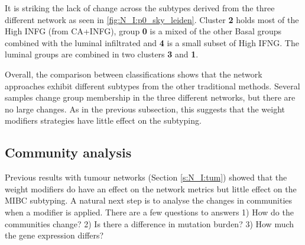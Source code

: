 It is striking the lack of change across the subtypes derived from the three different network as seen in \cref{fig:N_I:p0_sky_leiden}. Cluster \textbf{2} holds most of the High INFG (from CA+INFG), group \textbf{0} is a mixed of the other Basal groups combined with the luminal infiltrated and \textbf{4} is a small subset of High IFNG. The luminal groups are combined in two clusters \textbf{3} and \textbf{1}.



Overall, the comparison between classifications shows that the network approaches exhibit different subtypes from the other traditional methods. Several samples change group membership in the three different networks, but there are no large changes. As in the previous subsection, this suggests that the weight modifiers strategies have little effect on the subtyping.

\subsection{Community analysis}

Previous results with tumour networks (Section \ref{s:N_I:tum}) showed that the weight modifiers do have an effect on the network metrics but little effect on the MIBC subtyping. A natural next step is to analyse the changes in communities when a modifier is applied. There are a few questions to answers 1) How do the communities change? 2) Is there a difference in mutation burden? 3) How much the gene expression differs? 

